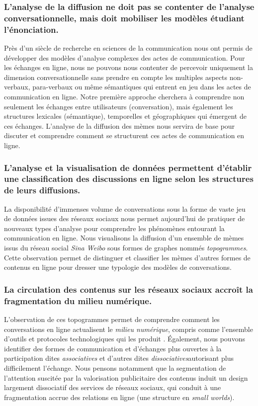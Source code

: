 \subsubsection{L'analyse de la diffusion ne doit pas se contenter de l'analyse conversationnelle, mais doit mobiliser les modèles étudiant l'énonciation.}

Près d'un siècle de recherche en sciences de la communication nous ont permis de développer des modèles d'analyse complexes des actes de communication. Pour les échanges en ligne, nous ne pouvons nous contenter de percevoir uniquement la dimension conversationnelle sans prendre en compte les multiples aspects non-verbaux, para-verbaux ou même sémantiques qui entrent en jeu dans les actes de communication en ligne. Notre première approche cherchera à comprendre non seulement les échanges entre utilisateurs (conversation), mais également les structures lexicales (sémantique), temporelles et géographiques qui émergent de ces échanges. L'analyse de la diffusion des mèmes nous servira de base pour discuter et comprendre comment se structurent ces actes de communication en ligne.


\subsubsection{L'analyse et la visualisation de données permettent d'établir une classification des discussions en ligne selon les structures de leurs diffusions.}

La disponibilité d'immenses volume de conversations sous la forme de vaste jeu de données issues des réseaux sociaux nous permet aujourd'hui de pratiquer de nouveaux types d'analyse pour comprendre les phénomènes entourant la communication en ligne. Nous visualisons la diffusion d'un ensemble de mèmes issus du réseau social \textit{Sina Weibo} sous formes de graphes nommés \textit{topogrammes}. Cette observation permet de distinguer et classifier les mèmes d'autres formes de contenus en ligne pour dresser une typologie des modèles de conversations.

\subsubsection{La circulation des contenus sur les réseaux sociaux accroît la fragmentation du milieu numérique.}

L{\textquoteright}observation de ces topogrammes permet de comprendre comment les conversations en ligne actualisent le \textit{milieu numérique}, compris comme l{\textquoteright}ensemble d'outils et protocoles technologiques qui les produit \citep{Hui2012}. \'Egalement, nous pouvons identifier des formes de communication et d'échanges plus ouvertes à la participation dites \textit{associatives} et d{\textquoteright}autres dites \textit{dissociatives}autorisant plus difficilement l{\textquoteright}échange. Nous pensons notamment que la segmentation de l{\textquoteright}attention suscitée par la valorisation publicitaire des contenus induit un design largement dissociatif des services de réseaux sociaux, qui conduit à une fragmentation accrue des relations en ligne (une structure en \textit{small worlds}).

